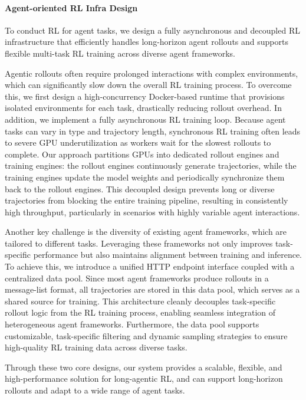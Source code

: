 \paragraph{Agent-oriented RL Infra Design}

To conduct RL for agent tasks, we design a fully asynchronous and decoupled RL infrastructure that efficiently handles long-horizon agent rollouts and supports flexible multi-task RL training across diverse agent frameworks.

Agentic rollouts often require prolonged interactions with complex environments, which can significantly slow down the overall RL training process. To overcome this, we first design a high-concurrency Docker-based runtime that provisions isolated environments for each task, drastically reducing rollout overhead. In addition, we implement a fully asynchronous RL training loop. Because agent tasks can vary in type and trajectory length, synchronous RL training often leads to severe GPU underutilization as workers wait for the slowest rollouts to complete. Our approach partitions GPUs into dedicated rollout engines and training engines: the rollout engines continuously generate trajectories, while the training engines update the model weights and periodically synchronize them back to the rollout engines. This decoupled design prevents long or diverse trajectories from blocking the entire training pipeline, resulting in consistently high throughput, particularly in scenarios with highly variable agent interactions.

Another key challenge is the diversity of existing agent frameworks, which are tailored to different tasks. Leveraging these frameworks not only improves task-specific performance but also maintains alignment between training and inference. To achieve this, we introduce a unified HTTP endpoint interface coupled with a centralized data pool. Since most agent frameworks produce rollouts in a message-list format, all trajectories are stored in this data pool, which serves as a shared source for training. This architecture cleanly decouples task-specific rollout logic from the RL training process, enabling seamless integration of heterogeneous agent frameworks. Furthermore, the data pool supports customizable, task-specific filtering and dynamic sampling strategies to ensure high-quality RL training data across diverse tasks.

Through these two core designs, our system provides a scalable, flexible, and high-performance solution for long-agentic RL, and can support long-horizon rollouts and adapt to a wide range of agent tasks.





